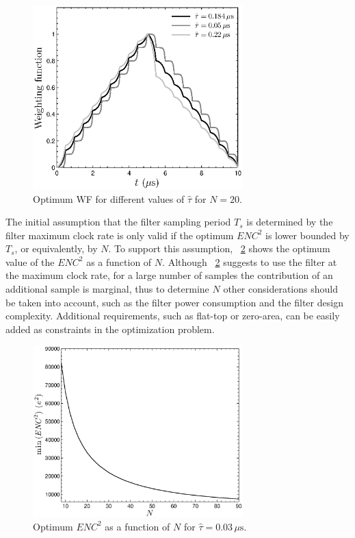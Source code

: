 \begin{figure}[!t]
	\centering
	\includegraphics[width=3.2in]{./Figures/optimum_wf.eps}
	\caption{Optimum WF for different values of $\hat{\tau}$ for $N=20$.}\label{fig:optimum_wf}
\end{figure}

The initial assumption that the filter sampling period $T_s$ is determined by the filter maximum clock rate is only valid if the optimum $\mathit{ENC}^2$ is lower bounded by $T_s$, or equivalently, by $N$. To support this assumption, \figurename~\ref{fig:optimum_N} shows the optimum value of the $\mathit{ENC}^2$ as a function of $N$. Although \figurename~\ref{fig:optimum_N} suggests to use the filter at the maximum clock rate, for a large number of samples the contribution of an additional sample is marginal, thus to determine $N$ other considerations should be taken into account, such as the filter power consumption and the filter design complexity. Additional requirements, such as \mbox{flat-top} or \mbox{zero-area}, can be easily added as constraints in the optimization problem.

\begin{figure}[!t]
	\centering
	\includegraphics[width=3.2in]{./Figures/optimum_N.eps}
	\caption{Optimum $\mathit{ENC}^2$ as a function of $N$ for $\hat{\tau} = 0.03\,\mu\text{s}$.}\label{fig:optimum_N}
\end{figure}



